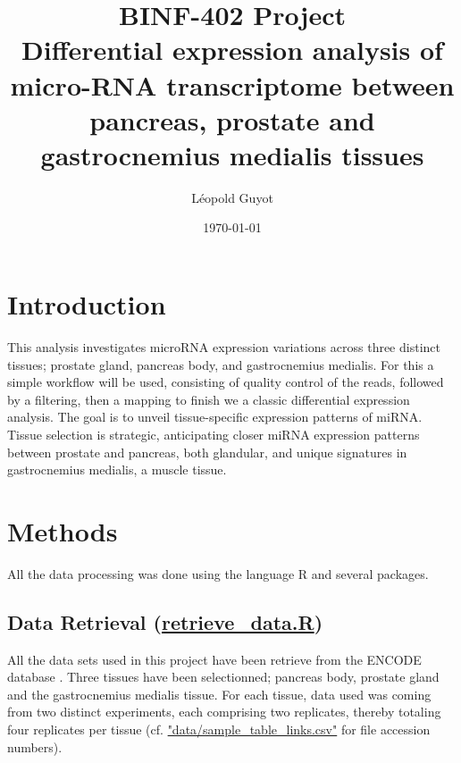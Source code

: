 \documentclass[a4paper, 11pt]{article}
\title{\Large BINF-402 Project \\
\huge Differential expression analysis of micro-RNA transcriptome between pancreas, prostate and gastrocnemius medialis tissues}
\author{Léopold Guyot}
\date{\today}
\begin{document}
\pagestyle{fancy}
\setlength{\headheight}{32.3pt}
\fancyhead{}\fancyfoot{}
\fancyfoot[R]{\thepage}

\maketitle

\begin{multicols}{2}
\section{Introduction}
This analysis investigates microRNA expression variations across three distinct tissues; prostate gland, pancreas body, and gastrocnemius medialis. For this a simple workflow will be used, consisting of quality control of the reads, followed by a filtering, then a mapping to finish we a classic differential expression analysis. The goal is to unveil tissue-specific expression patterns of miRNA. Tissue selection is strategic, anticipating closer miRNA expression patterns between prostate and pancreas, both glandular, and unique signatures in gastrocnemius medialis, a muscle tissue.

\section{Methods}
All the data processing was done using the language R \citep{Rlang} and several packages.
\subsection{Data Retrieval \small (\href{https://github.com/leopoldguyot/BINF-402_Transcriptomic_Project/blob/main/retrieve_data.R}{retrieve\_data.R})}
All the data sets used in this project have been retrieve from the ENCODE database \citep{luo2020new}.
Three tissues have been selectionned; pancreas body, prostate gland and the gastrocnemius medialis tissue.
For each tissue, data used was coming from two distinct experiments, each comprising two replicates, thereby totaling four replicates per tissue (cf. \href{https://github.com/leopoldguyot/BINF-402_Transcriptomic_Project/blob/data/sample_table_links.csv}{"data/sample\_table\_links.csv"} for file accession numbers).


\end{multicols}
\end{document}
